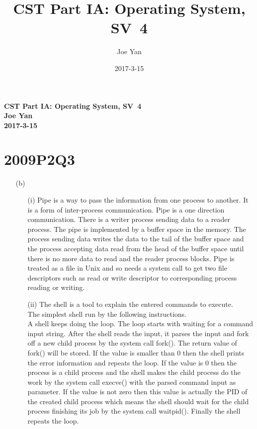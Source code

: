 \documentclass[10pt,twoside,a4paper]{article}
\newcommand{\studentname}{Joe Yan}
\newcommand{\svworkdate}{2017-3-15}
\newcommand{\svcourse}{CST Part IA: Operating System}
\newcommand{\svnumber}{4}
\begin{document}
\author{\studentname}
\title{\svcourse, SV~\svnumber}
\date{\svworkdate}

\textbf{\svcourse, SV~\svnumber}\\
\textbf{\studentname}\\
\textbf{\svworkdate}\\

\section{2009P2Q3}
\begin{itemize}
\item[(b)]
\begin{itemize}
\item[(i)]
Pipe is a way to pass the information from one process to another. It is a form of inter-process communication. Pipe is a one direction communication. There is a writer process sending data to a reader process. The pipe is implemented by a buffer space in the memory. The process sending data writes the data to the tail of the buffer space and the process accepting data read from the head of the buffer space until there is no more data to read and the reader process blocks. Pipe is treated as a file in Unix and so needs a system call to get two file descriptors such as read or write descriptor to corresponding process reading or writing.
\item[(ii)]
The shell is a tool to explain the entered commands to execute.
\\The simplest shell run by the following instructions.
\\A shell keeps doing the loop. The loop starts with waiting for a command input string. After the shell reads the input, it parses the input and fork off a new child process by the system call fork(). The return value of fork() will be stored. If the value is smaller than 0 then the shell prints the error information and repeats the loop. If the value is 0 then the process is a child process and the shell makes the child process do the work by the system call execve() with the parsed command input as parameter. If the value is not zero then this value is actually the PID of the created child process which means the shell should wait for the child process finishing its job by the system call waitpid(). Finally the shell repeats the loop.
\end{itemize}
\end{itemize}
\end{document}

